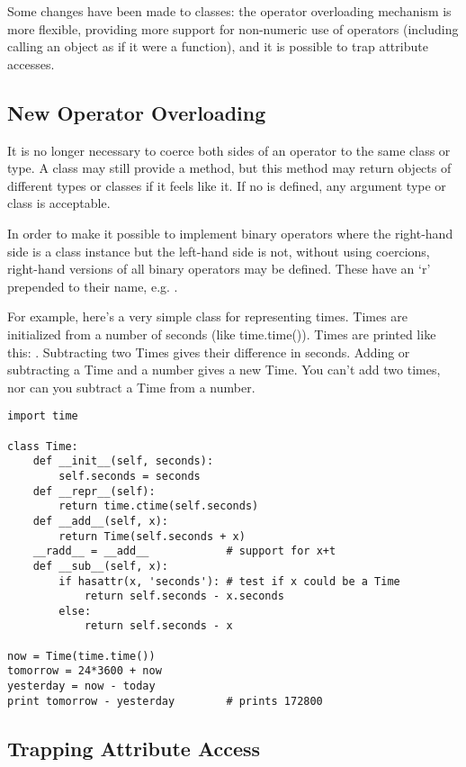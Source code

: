Some changes have been made to classes: the operator overloading
mechanism is more flexible, providing more support for non-numeric use
of operators (including calling an object as if it were a function),
and it is possible to trap attribute accesses.

\subsection{New Operator Overloading}

It is no longer necessary to coerce both sides of an operator to the
same class or type.  A class may still provide a 
method, but this method may return objects of different types or
classes if it feels like it.  If no  is defined, any
argument type or class is acceptable.

In order to make it possible to implement binary operators where the
right-hand side is a class instance but the left-hand side is not,
without using coercions, right-hand versions of all binary operators
may be defined.  These have an `r' prepended to their name,
e.g. .

For example, here's a very simple class for representing times.  Times
are initialized from a number of seconds (like time.time()).  Times
are printed like this: .  Subtracting
two Times gives their difference in seconds.  Adding or subtracting a
Time and a number gives a new Time.  You can't add two times, nor can
you subtract a Time from a number.

\begin{verbatim}
import time

class Time:
    def __init__(self, seconds):
        self.seconds = seconds
    def __repr__(self):
        return time.ctime(self.seconds)
    def __add__(self, x):
        return Time(self.seconds + x)
    __radd__ = __add__            # support for x+t
    def __sub__(self, x):
        if hasattr(x, 'seconds'): # test if x could be a Time
            return self.seconds - x.seconds
        else:
            return self.seconds - x

now = Time(time.time())
tomorrow = 24*3600 + now
yesterday = now - today
print tomorrow - yesterday        # prints 172800
\end{verbatim}

\subsection{Trapping Attribute Access}

